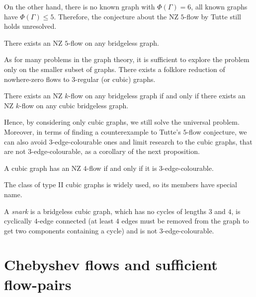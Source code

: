 On the other hand, there is no known graph with $\Phi(\Gamma)=6$, all known graphs have $\Phi(\Gamma)\leq 5$. Therefore, the conjecture about the NZ $5$-flow by Tutte still holds unresolved.

\begin{conjecture} \emph{\cite[p. 83]{tutte}}
    There exists an NZ $5$-flow on any bridgeless graph.\label{conj:5_flow}
\end{conjecture}

As for many problems in the graph theory, it is sufficient to explore the problem only on the smaller subset of graphs. There exists a folklore reduction of nowhere-zero flows to $3$-regular (or cubic) graphs.
\begin{proposition}
    There exists an NZ $k$-flow on any bridgeless graph if and only if there exists an NZ $k$-flow on any cubic bridgeless graph.\label{prop:reduction}
\end{proposition}

Hence, by considering only cubic graphs, we still solve the universal problem. Moreover, in terms of finding a counterexample to Tutte's $5$-flow conjecture, we can also avoid $3$-edge-colourable ones and limit research to the cubic graphs, that are not $3$-edge-colourable, as a corollary of the next proposition.

\begin{proposition} \emph{\cite[pp. 160, 161]{diestel}}
    A cubic graph has an NZ $4$-flow if and only if it is $3$-edge-colourable.
\end{proposition}

The class of type II cubic graphs is widely used, so its members have special name.
\begin{definition}
    A \emph{snark} is a bridgeless cubic graph, which has no cycles of lengths $3$ and $4$, is cyclically $4$-edge connected (at least $4$ edges must be removed from the graph to get two components containing a cycle) and is not $3$-edge-colourable.
\end{definition}

\section{Chebyshev flows and sufficient flow-pairs}

